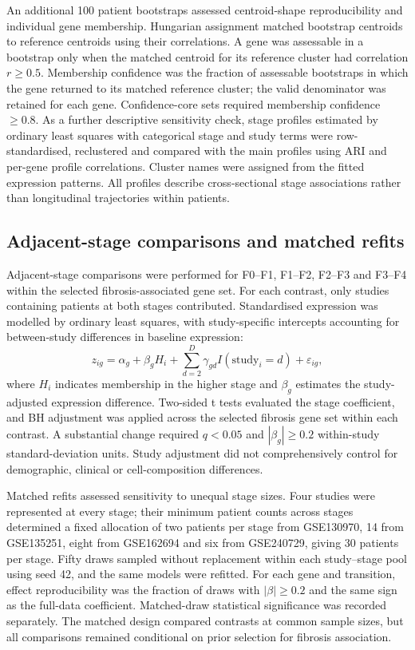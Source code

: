 \documentclass[11pt,a4paper]{article}
\begin{document}
An additional 100 patient bootstraps assessed centroid-shape reproducibility and individual gene membership. Hungarian assignment matched bootstrap centroids to reference centroids using their correlations. A gene was assessable in a bootstrap only when the matched centroid for its reference cluster had correlation \(r\geq0.5\). Membership confidence was the fraction of assessable bootstraps in which the gene returned to its matched reference cluster; the valid denominator was retained for each gene. Confidence-core sets required membership confidence \(\geq0.8\). As a further descriptive sensitivity check, stage profiles estimated by ordinary least squares with categorical stage and study terms were row-standardised, reclustered and compared with the main profiles using ARI and per-gene profile correlations. Cluster names were assigned from the fitted expression patterns. All profiles describe cross-sectional stage associations rather than longitudinal trajectories within patients.

\subsection*{Adjacent-stage comparisons and matched refits}
Adjacent-stage comparisons were performed for F0--F1, F1--F2, F2--F3 and F3--F4 within the selected fibrosis-associated gene set. For each contrast, only studies containing patients at both stages contributed. Standardised expression was modelled by ordinary least squares, with study-specific intercepts accounting for between-study differences in baseline expression:
\[
z_{ig}=\alpha_g+\beta_g H_i+\sum_{d=2}^{D}\gamma_{gd}I(\mathrm{study}_i=d)+\varepsilon_{ig},
\]
where \(H_i\) indicates membership in the higher stage and \(\beta_g\) estimates the study-adjusted expression difference. Two-sided t tests evaluated the stage coefficient, and BH adjustment was applied across the selected fibrosis gene set within each contrast. A substantial change required \(q<0.05\) and \(|\beta_g|\geq0.2\) within-study standard-deviation units. Study adjustment did not comprehensively control for demographic, clinical or cell-composition differences.

Matched refits assessed sensitivity to unequal stage sizes. Four studies were represented at every stage; their minimum patient counts across stages determined a fixed allocation of two patients per stage from GSE130970, 14 from GSE135251, eight from GSE162694 and six from GSE240729, giving 30 patients per stage. Fifty draws sampled without replacement within each study--stage pool using seed 42, and the same models were refitted. For each gene and transition, effect reproducibility was the fraction of draws with \(|\beta|\geq0.2\) and the same sign as the full-data coefficient. Matched-draw statistical significance was recorded separately. The matched design compared contrasts at common sample sizes, but all comparisons remained conditional on prior selection for fibrosis association.
\end{document}
